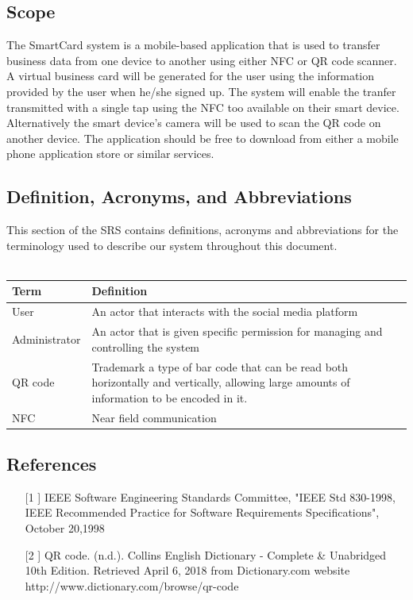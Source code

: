 \documentclass[english]{article}
\begin{document}
		\subsection{Scope}
The SmartCard system is a mobile-based application that is used to transfer business data from one device to another using either NFC or QR code scanner. A virtual business card will be generated for the user using the information provided by the user when he/she signed up. The system will enable the tranfer transmitted with a single tap using the NFC too available on their smart device. Alternatively the smart device’s camera will be used to scan the QR code on another device. The application should be free to download from either a mobile phone application store or similar services. 


		\subsection{Definition, Acronyms, and Abbreviations}
				This section of the SRS contains definitions, acronyms and abbreviations for the terminology used to describe our system throughout this document.
				\\
				\\
				\begin{tabular}{ |p{3cm}|p{9cm}|  }
				\hline
				\textbf{Term} & \textbf{Definition}\\
				\hline
				User & An actor that interacts with the social media platform\\
				\hline
				Administrator & An actor that is given specific permission for managing and controlling the system\\
				\hline
				QR code & Trademark a type of bar code that can be read both horizontally and vertically, allowing large amounts of information to be encoded in it.\\
				\hline
				NFC & Near field communication \\
				\hline
				\end{tabular}


		\subsection{References}
\begin{itemize}
			\item [[1]] IEEE Software Engineering Standards Committee, "IEEE Std 830-1998, IEEE Recommended Practice for Software Requirements Specifications", October 20,1998 \\
			\item [[2]] QR code. (n.d.). Collins English Dictionary - Complete \& Unabridged 10th Edition. Retrieved April 6, 2018 from Dictionary.com website http://www.dictionary.com/browse/qr-code
		
		\end{itemize}
\end{document}
